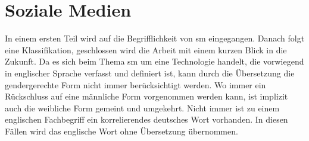 %
%

\chapter{Soziale Medien}\label{chap.sm}
\glsresetall
In einem ersten Teil wird auf die Begrifflichkeit von \gls{sm} eingegangen. Danach folgt eine Klassifikation, geschlossen wird die Arbeit mit einem kurzen Blick in die Zukunft.\newline
Da es sich beim Thema \gls{sm} um eine Technologie handelt, die vorwiegend in englischer Sprache verfasst und definiert ist, kann durch die Übersetzung die gendergerechte Form nicht immer berücksichtigt werden. Wo immer ein Rückschluss auf eine männliche Form vorgenommen werden kann, ist implizit auch die weibliche Form gemeint und umgekehrt.  Nicht immer ist zu einem englischen Fachbegriff ein korrelierendes deutsches Wort vorhanden. In diesen Fällen wird das englische Wort ohne Übersetzung übernommen.
